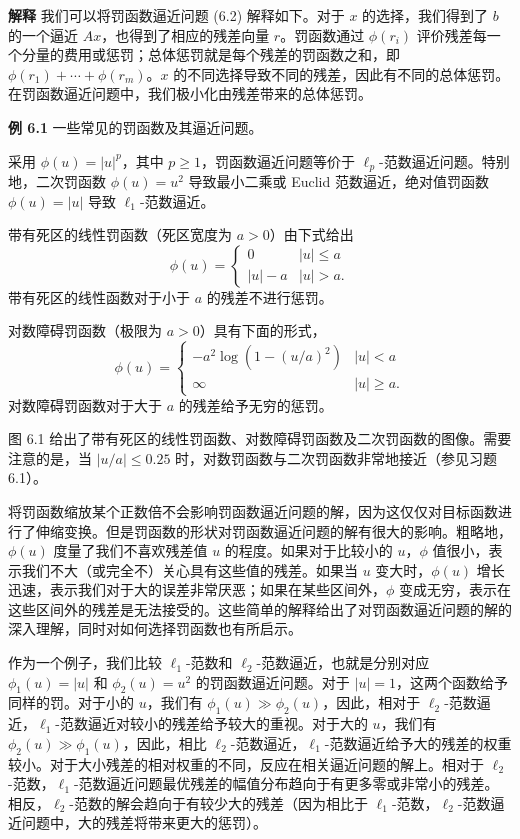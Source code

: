 \documentclass[UTF8,12pt,a4paper,fontset=fandol]{ctexart}
\begin{document}
\noindent\textbf{解释}\quad
我们可以将罚函数逼近问题 (6.2) 解释如下。对于 $x$ 的选择，我们得到了 $b$ 的一个逼近 $Ax$，也得到了相应的残差向量 $r$。罚函数通过 $\phi(r_i)$ 评价残差每一个分量的费用或惩罚；总体惩罚就是每个残差的罚函数之和，即 $\phi(r_1)+\cdots+\phi(r_m)$。$x$ 的不同选择导致不同的残差，因此有不同的总体惩罚。在罚函数逼近问题中，我们极小化由残差带来的总体惩罚。

\noindent\textbf{例 6.1}\quad
一些常见的罚函数及其逼近问题。

采用 $\phi(u)=|u|^p$，其中 $p\geq 1$，罚函数逼近问题等价于 $\ell_p$-范数逼近问题。特别地，二次罚函数 $\phi(u)=u^2$ 导致最小二乘或 Euclid 范数逼近，绝对值罚函数 $\phi(u)=|u|$ 导致 $\ell_1$-范数逼近。

带有死区的线性罚函数（死区宽度为 $a>0$）由下式给出
\[
\phi(u)=
\begin{cases}
0 & |u|\leq a\\
|u|-a & |u|>a.
\end{cases}
\]
带有死区的线性函数对于小于 $a$ 的残差不进行惩罚。

对数障碍罚函数（极限为 $a>0$）具有下面的形式，
\[
\phi(u)=
\begin{cases}
-a^2\log(1-(u/a)^2) & |u|<a\\
\infty & |u|\geq a.
\end{cases}
\]
对数障碍罚函数对于大于 $a$ 的残差给予无穷的惩罚。

图 6.1 给出了带有死区的线性罚函数、对数障碍罚函数及二次罚函数的图像。需要注意的是，当 $|u/a|\leq 0.25$ 时，对数罚函数与二次罚函数非常地接近（参见习题 6.1）。

将罚函数缩放某个正数倍不会影响罚函数逼近问题的解，因为这仅仅对目标函数进行了伸缩变换。但是罚函数的形状对罚函数逼近问题的解有很大的影响。粗略地，$\phi(u)$ 度量了我们不喜欢残差值 $u$ 的程度。如果对于比较小的 $u$，$\phi$ 值很小，表示我们不大（或完全不）关心具有这些值的残差。如果当 $u$ 变大时，$\phi(u)$ 增长迅速，表示我们对于大的误差非常厌恶；如果在某些区间外，$\phi$ 变成无穷，表示在这些区间外的残差是无法接受的。这些简单的解释给出了对罚函数逼近问题的解的深入理解，同时对如何选择罚函数也有所启示。

作为一个例子，我们比较 $\ell_1$-范数和 $\ell_2$-范数逼近，也就是分别对应 $\phi_1(u)=|u|$ 和 $\phi_2(u)=u^2$ 的罚函数逼近问题。对于 $|u|=1$，这两个函数给予同样的罚。对于小的 $u$，我们有 $\phi_1(u)\gg \phi_2(u)$，因此，相对于 $\ell_2$-范数逼近，$\ell_1$-范数逼近对较小的残差给予较大的重视。对于大的 $u$，我们有 $\phi_2(u)\gg \phi_1(u)$，因此，相比 $\ell_2$-范数逼近，$\ell_1$-范数逼近给予大的残差的权重较小。对于大小残差的相对权重的不同，反应在相关逼近问题的解上。相对于 $\ell_2$-范数，$\ell_1$-范数逼近问题最优残差的幅值分布趋向于有更多零或非常小的残差。相反，$\ell_2$-范数的解会趋向于有较少大的残差（因为相比于 $\ell_1$-范数，$\ell_2$-范数逼近问题中，大的残差将带来更大的惩罚）。
\end{document}
